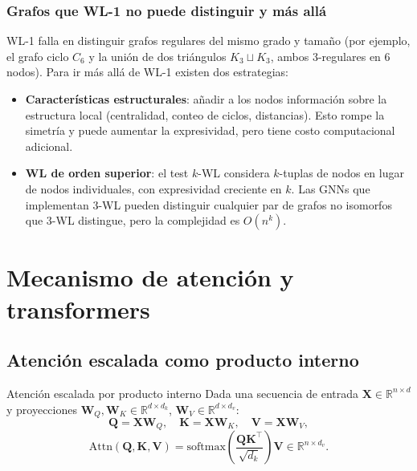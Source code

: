 \subsubsection*{Grafos que WL-1 no puede distinguir y más allá}

WL-1 falla en distinguir grafos regulares del mismo grado y tamaño (por ejemplo,
el grafo ciclo $C_6$ y la unión de dos triángulos $K_3 \sqcup K_3$, ambos
3-regulares en 6 nodos). Para ir más allá de WL-1 existen dos estrategias:
\begin{itemize}
  \item \textbf{Características estructurales}: añadir a los nodos información
        sobre la estructura local (centralidad, conteo de ciclos,
        distancias). Esto rompe la simetría y puede aumentar la expresividad,
        pero tiene costo computacional adicional.
  \item \textbf{WL de orden superior}: el test $k$-WL considera $k$-tuplas de
        nodos en lugar de nodos individuales, con expresividad creciente en $k$.
        Las GNNs que implementan 3-WL pueden distinguir cualquier par de grafos
        no isomorfos que 3-WL distingue, pero la complejidad es $O(n^k)$.
\end{itemize}

\section{Mecanismo de atención y transformers}
\label{sec:attention}

\subsection{Atención escalada como producto interno}
\label{subsec:atencion}

\begin{definicion}{Atención escalada por producto interno}
\label{def:atencion}
Dada una secuencia de entrada $\bm{X} \in \mathbb{R}^{n\times d}$ y proyecciones
$\bm{W}_Q, \bm{W}_K \in \mathbb{R}^{d \times d_k}$, $\bm{W}_V \in \mathbb{R}^{d\times d_v}$:
\[
  \bm{Q} = \bm{X}\bm{W}_Q, \quad
  \bm{K} = \bm{X}\bm{W}_K, \quad
  \bm{V} = \bm{X}\bm{W}_V,
\]
\[
  \mathrm{Attn}(\bm{Q},\bm{K},\bm{V})
  = \mathrm{softmax}\!\left(\frac{\bm{Q}\bm{K}^\top}{\sqrt{d_k}}\right)\bm{V}
  \in \mathbb{R}^{n\times d_v}.
\]
\end{definicion}

